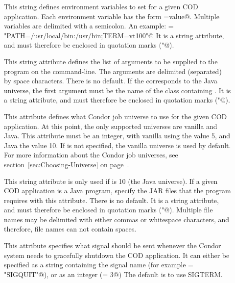 \begin{description}
 \item[] This string defines environment variables to
   set for a given COD application.
   Each environment variable has the form \verb@NAME=value@.
   Multiple variables are delimited with a semicolon.
   An example: \verb@Env = "PATH=/usr/local/bin:/usr/bin;TERM=vt100"@ 
   It is a string attribute, and must therefore be enclosed in 
   quotation marks (\verb@"@).

 \item[] This string attribute defines the list of
   arguments to be supplied to the program on the command-line.
   The arguments are delimited (separated) by space characters. 
   There is no default. 
   If the  corresponds to the Java
   universe, the first argument must be the name of the class
   containing .
   It is a string attribute, and must therefore be enclosed in 
   quotation marks (\verb@"@).

 \item[] This attribute defines what Condor job
   universe to use for the given COD application.
   At this point, the only supported universes are vanilla and Java.
   This attribute must be an integer, with vanilla using the value 5,
   and Java the value 10.
   If  is not specified, the vanilla universe is
   used by default.
   For more information about the Condor job universes, see
   section~\ref{sec:Choosing-Universe} on
   page~\pageref{sec:Choosing-Universe}. 

 \item[] This string attribute is only used if
    is 10 (the Java universe).
   If a given COD application is a Java program, specify the
   JAR files that the program requires with this attribute.
   There is no default.
   It is a string attribute, and must therefore be enclosed in 
   quotation marks (\verb@"@).
   Multiple file names may be delimited with either commas or whitespace
   characters, and
   therefore, file names can not contain spaces.

 \item[] This attribute specifies what signal should be
   sent whenever the Condor system needs to gracefully shutdown the
   COD application.
   It can either be specified as a string containing the signal name
   (for example \verb@KillSig = "SIGQUIT"@), or as an integer
   (\verb@KillSig = 3@)
   The default is to use SIGTERM.


\end{description}
